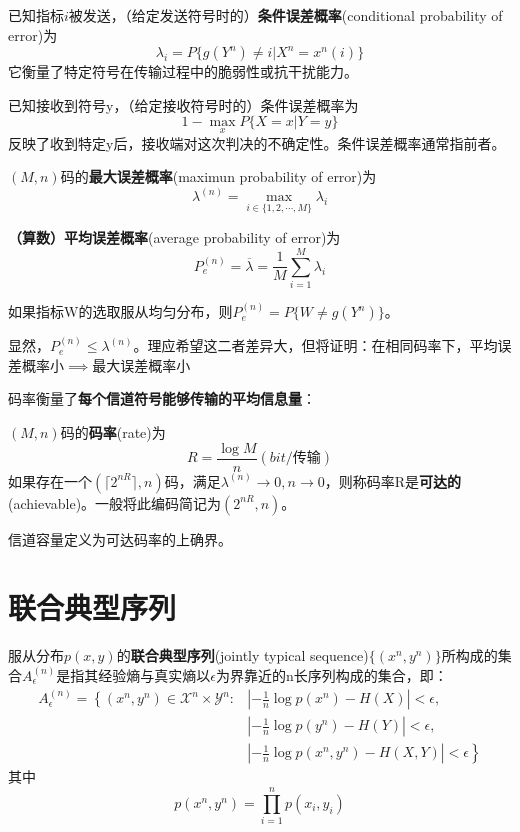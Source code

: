 \documentclass{ctexbook}
\begin{document}
\begin{definition}[条件误差概率]
    已知指标$i$被发送，（给定发送符号时的）\textbf{条件误差概率}(conditional probability of error)为
    \[\lambda_i=P\{g(Y^n)\neq i|X^n=x^n(i)\}\]
    它衡量了特定符号在传输过程中的脆弱性或抗干扰能力。

    已知接收到符号y，（给定接收符号时的）条件误差概率为
    \[1-\max_{x}P\{X=x|Y=y\}\]
    反映了收到特定y后，接收端对这次判决的不确定性。条件误差概率通常指前者。
\end{definition}

\begin{definition}
    $(M,n)$码的\textbf{最大误差概率}(maximun probability of error)为
    \[\lambda^{(n)}=\max_{i\in\{1,2,\cdots,M\}} \lambda_i\]

    \textbf{（算数）平均误差概率}(average probability of error)为
    \[P^{(n)}_e=\overline{\lambda}=\frac{1}{M}\sum_{i=1}^{M}\lambda_i\]
\end{definition}

\begin{remark}
    如果指标W的选取服从均匀分布，则$P^{(n)}_e=P\{W\neq g(Y^n)\}$。
\end{remark}
\begin{remark}
    显然，$P_e^{(n)}\leq \lambda^{(n)}$。理应希望这二者差异大，但将证明：在相同码率下，平均误差概率小$\implies$最大误差概率小
\end{remark}

码率衡量了\textbf{每个信道符号能够传输的平均信息量}：

\begin{definition}[码率]
    $(M,n)$码的\textbf{码率}(rate)为
    \[R=\frac{\log M}{n}(bit/\text{传输})\]
    如果存在一个$(\lceil 2^{nR}\rceil,n)$码，满足$\lambda^{(n)}\to 0,n\to 0$，则称码率R是\textbf{可达的}(achievable)。一般将此编码简记为$(2^{nR},n)$。

    信道容量定义为可达码率的上确界。
\end{definition}

\section{联合典型序列}

\begin{definition}[联合典型序列]
    服从分布$p(x,y)$的\textbf{联合典型序列}(jointly typical sequence)$\{(x^n,y^n)\}$所构成的集合$A^{(n)}_{\epsilon}$是指其经验熵与真实熵以$\epsilon$为界靠近的n长序列构成的集合，即：
    \begin{align*}
        A^{(n)}_{\epsilon}=\left\{(x^n,y^n)\in \mathcal{X}^n\times \mathcal{Y}^n:\right.
        &\left|-\frac{1}{n}\log p(x^n)-H(X)\right|<\epsilon,\\
        &\left|-\frac{1}{n}\log p(y^n)-H(Y)\right|<\epsilon,\\
        &\left.\left|-\frac{1}{n}\log p(x^n,y^n)-H(X,Y)\right|<\epsilon\right\}
    \end{align*}
    其中
    \[p(x^n,y^n)=\prod_{i=1}^{n}p(x_i,y_i)\]
\end{definition}
\end{document}
